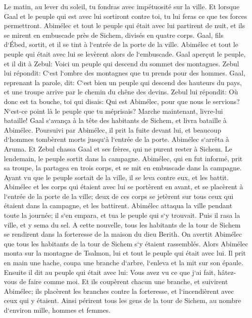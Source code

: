 \verse Le matin, au lever du soleil, tu fondras avec impétuosité sur la ville. Et lorsque Gaal et le peuple qui est avec lui sortiront contre toi, tu lui feras ce que tes forces permettront. 
\verse Abimélec et tout le peuple qui était avec lui partirent de nuit, et ils se mirent en embuscade près de Sichem, divisés en quatre corps. 
\verse Gaal, fils d`Ébed, sortit, et il se tint à l`entrée de la porte de la ville. Abimélec et tout le peuple qui était avec lui se levèrent alors de l`embuscade. 
\verse Gaal aperçut le peuple, et il dit à Zebul: Voici un peuple qui descend du sommet des montagnes. Zebul lui répondit: C`est l`ombre des montagnes que tu prends pour des hommes. 
\verse Gaal, reprenant la parole, dit: C`est bien un peuple qui descend des hauteurs du pays, et une troupe arrive par le chemin du chêne des devins. 
\verse Zebul lui répondit: Où donc est ta bouche, toi qui disais: Qui est Abimélec, pour que nous le servions? N`est-ce point là le peuple que tu méprisais? Marche maintenant, livre-lui bataille! 
\verse Gaal s`avança à la tête des habitants de Sichem, et livra bataille à Abimélec. 
\verse Poursuivi par Abimélec, il prit la fuite devant lui, et beaucoup d`hommes tombèrent morts jusqu`à l`entrée de la porte. 
\verse Abimélec s`arrêta à Aruma. Et Zebul chassa Gaal et ses frères, qui ne purent rester à Sichem. 
\verse Le lendemain, le peuple sortit dans la campagne. Abimélec, qui en fut informé, 
\verse prit sa troupe, la partagea en trois corps, et se mit en embuscade dans la campagne. Ayant vu que le peuple sortait de la ville, il se leva contre eux, et les battit. 
\verse Abimélec et les corps qui étaient avec lui se portèrent en avant, et se placèrent à l`entrée de la porte de la ville; deux de ces corps se jetèrent sur tous ceux qui étaient dans la campagne, et les battirent. 
\verse Abimélec attaqua la ville pendant toute la journée; il s`en empara, et tua le peuple qui s`y trouvait. Puis il rasa la ville, et y sema du sel. 
\verse A cette nouvelle, tous les habitants de la tour de Sichem se rendirent dans la forteresse de la maison du dieu Berith. 
\verse On avertit Abimélec que tous les habitants de la tour de Sichem s`y étaient rassemblés. 
\verse Alors Abimélec monta sur la montagne de Tsalmon, lui et tout le peuple qui était avec lui. Il prit en main une hache, coupa une branche d`arbre, l`enleva et la mit sur son épaule. Ensuite il dit au peuple qui était avec lui: Vous avez vu ce que j`ai fait, hâtez-vous de faire comme moi. 
\verse Et ils coupèrent chacun une branche, et suivirent Abimélec; ils placèrent les branches contre la forteresse, et l`incendièrent avec ceux qui y étaient. Ainsi périrent tous les gens de la tour de Sichem, au nombre d`environ mille, hommes et femmes. 
